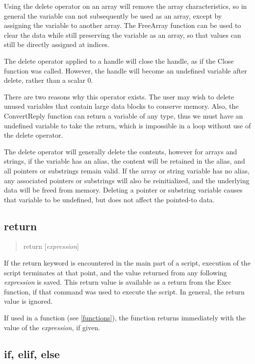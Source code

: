 Using the {\vt delete} operator on an array will remove the array
characteristics, so in general the variable can not subsequently be
used as an array, except by assigning the variable to another array. 
The {\vt FreeArray} function can be used to clear the data while still
preserving the variable as an array, so that values can still be
directly assigned at indices.

The delete operator applied to a handle will close the handle, as if
the {\vt Close} function was called.  However, the handle will become
an undefined variable after {\vt delete}, rather than a scalar 0.

There are two reasons why this operator exists.  The user may wish to
delete unused variables that contain large data blocks to conserve
memory.  Also, the {\vt ConvertReply} function can return a variable
of any type, thus we must have an undefined variable to take the
return, which is impossible in a loop without use of the {\vt delete}
operator.

The {\vt delete} operator will generally delete the contents, however
for arrays and strings, if the variable has an alias, the content will
be retained in the alias, and all pointers or substrings remain valid. 
If the array or string variable has no alias, any associated pointers
or substrings will also be reinitialized, and the underlying data will
be freed from memory.  Deleting a pointer or substring variable causes
that variable to be undefined, but does not affect the pointed-to
data.

\subsection{\vt return}

\begin{quote}
{\vt return} $[${\it expression\/}$]$
\end{quote}

If the {\vt return} keyword is encountered in the main part of a
script, execution of the script terminates at that point, and the
value returned from any following {\it expression} is saved.  This
return value is available as a return from the {\vt Exec} function, if
that command was used to execute the script.  In general, the return
value is ignored.

If used in a function (see \ref{functions}), the function returns
immediately with the value of the {\it expression}, if given.

\subsection{\vt if, elif, else}

